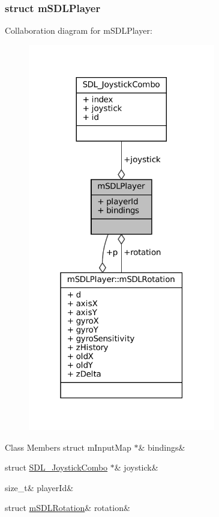 \subsubsection{struct m\+S\+D\+L\+Player}


Collaboration diagram for m\+S\+D\+L\+Player\+:
\nopagebreak
\begin{figure}[H]
\begin{center}
\leavevmode
\includegraphics[width=232pt]{structm_s_d_l_player__coll__graph}
\end{center}
\end{figure}
\begin{DoxyFields}{Class Members}
\mbox{\label{sdl-events_8h_af4e373d9db5ced2ceea5752c3e57ba59}} 
struct mInputMap $\ast$&
bindings&
\\
\hline

\mbox{\label{sdl-events_8h_a36fb8d258924890cf80b4f658163edf0}} 
struct \mbox{\hyperlink{sdl-events_8h_struct_s_d_l___joystick_combo}{SDL\_JoystickCombo}} $\ast$&
joystick&
\\
\hline

\mbox{\label{sdl-events_8h_aeb8b8a54e36505006017133a8e6d3435}} 
size\_t&
playerId&
\\
\hline

\mbox{\label{sdl-events_8h_a68beb5e3d3e75861a611bd7c368d866e}} 
struct \mbox{\hyperlink{sdl-events_8h_structm_s_d_l_player_1_1m_s_d_l_rotation}{mSDLRotation}}&
rotation&
\\
\hline

\end{DoxyFields}
